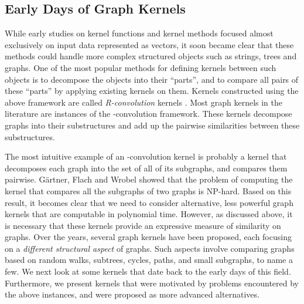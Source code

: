 \documentclass[twoside,11pt]{article}
\begin{document}
\subsection{Early Days of Graph Kernels}
While early studies on kernel functions and kernel methods focused almost exclusively on input data represented as vectors, it soon became clear that these methods could handle more complex structured objects such as strings, trees and graphs.
One of the most popular methods for defining kernels between such objects is to decompose the objects into their ``parts'', and to compare all pairs of these ``parts'' by applying existing kernels on them.
Kernels constructed using the above framework are called \textit{R-convolution} kernels \cite{haussler1999convolution}.
Most graph kernels in the literature are instances of the -convolution framework.
These kernels decompose graphs into their substructures and add up the pairwise similarities between these substructures.

The most intuitive example of an -convolution kernel is probably a kernel that decomposes each graph into the set of all of its subgraphs, and compares them pairwise.
G{\"a}rtner, Flach and Wrobel \citeyear{gartner2003graph} showed that the problem of computing the kernel that compares all the subgraphs of two graphs is NP-hard.
Based on this result, it becomes clear that we need to consider alternative, less powerful graph kernels that are computable in polynomial time.
However, as discussed above, it is necessary that these kernels provide an expressive measure of similarity on graphs.
Over the years,  several graph kernels have been proposed, each focusing on a \textit{different structural aspect} of graphs.
Such aspects involve comparing graphs based on random walks, subtrees, cycles, paths, and small subgraphs, to name a few.
We next look at some kernels that date back to the early days of this field.
Furthermore, we present kernels that were motivated by problems encountered by the above instances, and were proposed as more advanced alternatives. 
\end{document}
